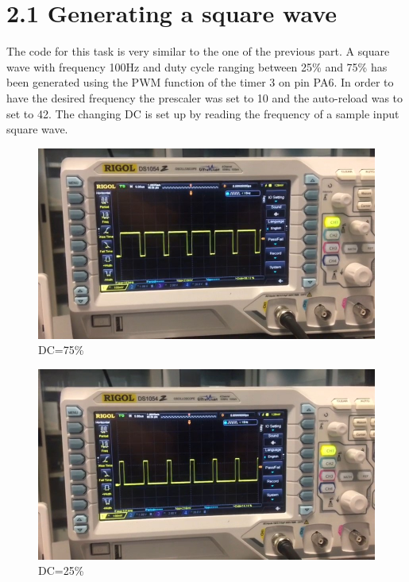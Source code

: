 \documentclass[12pt]{article}
\begin{document}
\newpage
\section*{2.1 Generating a square wave}
The code for this task is very similar to the one of the previous part. A square wave with frequency 100Hz and duty cycle ranging between 25\% and 75\% has been generated using the PWM function of the timer 3 on pin PA6. In order to have the desired frequency the prescaler was set to 10 and the auto-reload was to set to 42. The changing DC is set up by reading the frequency of a sample input square wave.

\begin{figure}[h!]
	\centering
	\includegraphics[scale = 0.4]{immagini/Whs.jpg}
	\caption{DC=75\%}
\end{figure}

\begin{figure}[h!]
\centering
\includegraphics[scale = 0.4]{immagini/ji.jpg}
\caption{DC=25\%}
\end{figure}
\end{document}
